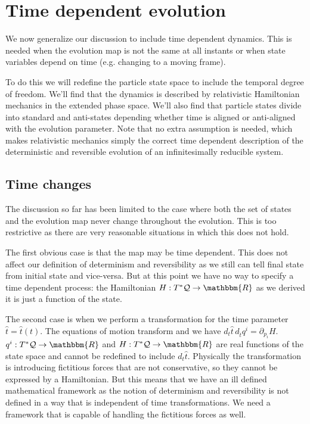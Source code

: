 \documentclass[aps,pra,10pt,twocolumn,floatfix,nofootinbib]{revtex4-1}
\numberwithin{equation}{section}
\theoremstyle{definition}
\begin{document}
\section{Time dependent evolution}

We now generalize our discussion to include time dependent dynamics. This is needed when the evolution map is not the same at all instants or when state variables depend on time (e.g. changing to a moving frame).

To do this we will redefine the particle state space to include the temporal degree of freedom. We'll find that the dynamics is described by relativistic Hamiltonian mechanics in the extended phase space. We'll also find that particle states divide into standard and anti-states depending whether time is aligned or anti-aligned with the evolution parameter. Note that no extra assumption is needed, which makes relativistic mechanics simply the correct time dependent description of the deterministic and reversible evolution of an infinitesimally reducible system.

\subsection{Time changes}

The discussion so far has been limited to the case where both the set of states and the evolution map never change throughout the evolution. This is too restrictive as there are very reasonable situations in which this does not hold.

The first obvious case is that the map may be time dependent. This does not affect our definition of determinism and reversibility as we still can tell final state from initial state and vice-versa. But at this point we have no way to specify a time dependent process: the Hamiltonian $H: T^*\mathcal{Q} \rightarrow \mathbbm{R}$ as we derived it is just a function of the state.

The second case is when we perform a transformation for the time parameter $\hat{t}=\hat{t}(t)$. The equations of motion transform and we have $d_{t}\hat{t} \, d_{\hat{t}}q^i = \partial_{p_i} H$. $q^i: T^*\mathcal{Q} \rightarrow \mathbbm{R}$ and $H: T^*\mathcal{Q} \rightarrow \mathbbm{R}$ are real functions of the state space and cannot be redefined to include $d_{t}\hat{t}$. Physically the transformation is introducing fictitious forces that are not conservative, so they cannot be expressed by a Hamiltonian. But this means that we have an ill defined mathematical framework as the notion of determinism and reversibility is not defined in a way that is independent of time transformations. We need a framework that is capable of handling the fictitious forces as well.
\end{document}
